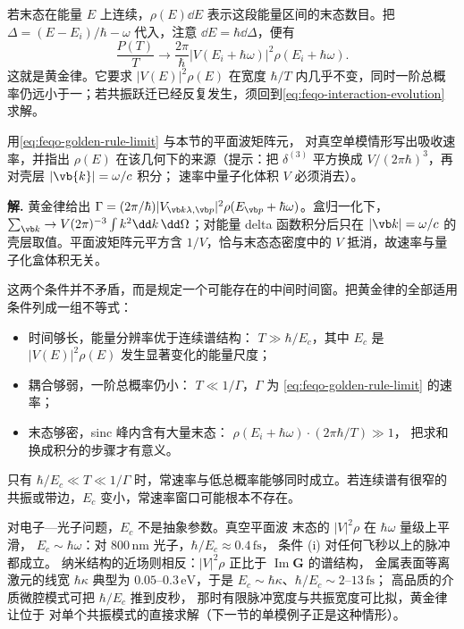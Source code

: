 若末态在能量 \(E\) 上连续，\(\rho(E)\dd E\) 表示这段能量区间的末态数目。把 \(\Delta=(E-E_i)/\hbar-\omega\) 代入，注意 \(\dd E=\hbar\dd\Delta\)，便有
\begin{equation}
\frac{P(T)}{T}\longrightarrow
\frac{2\pi}{\hbar}|V(E_i+\hbar\omega)|^2\rho(E_i+\hbar\omega).
\label{eq:feqo-golden-rule-limit}
\end{equation}
这就是黄金律。它要求 \(|V(E)|^2\rho(E)\) 在宽度 \(\hbar/T\) 内几乎不变，同时一阶总概率仍远小于一；若共振跃迁已经反复发生，须回到\cref{eq:feqo-interaction-evolution} 求解。


\par
\begin{workedexample}
用\cref{eq:feqo-golden-rule-limit} 与本节的平面波矩阵元，
对真空单模情形写出吸收速率，并指出 \(\rho(E)\)
在该几何下的来源（提示：把 \(\delta^{(3)}\) 平方换成
\(V/(2\pi\hbar)^3\)，再对壳层 \(|\vb{k}|=\omega/c\) 积分；
速率中量子化体积 \(V\) 必须消去）。

\textbf{解.} 黄金律给出 \(\Gamma=(2\pi/\hbar)|V_{\vb k\lambda,\vb p}|^2\rho(E_{\vb p}+\hbar\omega)\)。盒归一化下，\(\sum_{\vb k}\to V(2\pi)^{-3}\int k^2\dd k\,\dd\Omega\)；对能量 delta 函数积分后只在 \(|\vb k|=\omega/c\) 的壳层取值。平面波矩阵元平方含 \(1/V\)，恰与末态态密度中的 \(V\) 抵消，故速率与量子化盒体积无关。
\end{workedexample}
\par
这两个条件并不矛盾，而是规定一个可能存在的中间时间窗。把黄金律的全部适用条件列成一组不等式：
\begin{itemize}
\item[(i)] 时间够长，能量分辨率优于连续谱结构：
\(T\gg\hbar/E_c\)，其中 \(E_c\) 是
\(|V(E)|^2\rho(E)\) 发生显著变化的能量尺度；
\item[(ii)] 耦合够弱，一阶总概率仍小：
\(T\ll1/\Gamma\)，\(\Gamma\) 为
\cref{eq:feqo-golden-rule-limit} 的速率；
\item[(iii)] 末态够密，sinc 峰内含有大量末态：
\(\rho(E_i+\hbar\omega)\cdot(2\pi\hbar/T)\gg1\)，
把求和换成积分的步骤才有意义。
\end{itemize}
只有 \(\hbar/E_c\ll T\ll1/\Gamma\) 时，常速率与低总概率能够同时成立。若连续谱有很窄的共振或带边，\(E_c\) 变小，常速率窗口可能根本不存在。

对电子—光子问题，\(E_c\) 不是抽象参数。真空平面波
末态的 \(|V|^2\rho\) 在 \(\hbar\omega\) 量级上平滑，
\(E_c\sim\hbar\omega\)：对 \(800\,\si{\nano\metre}\)
光子，\(\hbar/E_c\approx0.4\,\si{\femto\second}\)，
条件 (i) 对任何飞秒以上的脉冲都成立。
纳米结构的近场则相反：\(|V|^2\rho\) 正比于
\(\operatorname{Im}\mathbf G\) 的谱结构，
金属表面等离激元的线宽 \(\hbar\kappa\) 典型为
\(0.05\)--\(0.3\,\si{\electronvolt}\)，于是
\(E_c\sim\hbar\kappa\)、\(\hbar/E_c\sim2\)--\(13\,\si{\femto\second}\)；
高品质的介质微腔模式可把 \(\hbar/E_c\) 推到皮秒，
那时有限脉冲宽度与共振宽度可比拟，黄金律让位于
对单个共振模式的直接求解（下一节的单模例子正是这种情形）。

